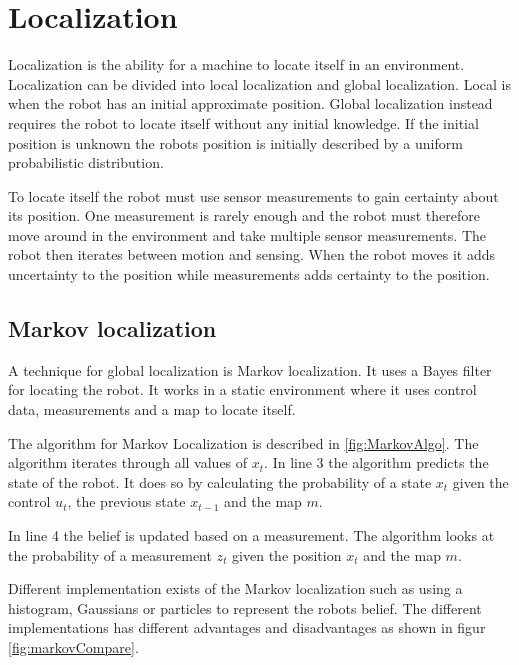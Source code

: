 \chapter{Localization}
\label{chp:local}

Localization is the ability for a machine to locate itself in an environment. Localization can be divided into local localization and global localization. Local is when the robot has an initial approximate position. Global localization instead requires the robot to locate itself without any initial knowledge. If the initial position is unknown the robots position is initially described by a uniform probabilistic distribution. 

To locate itself the robot must use sensor measurements to gain certainty about its position. One measurement is rarely enough and the robot must therefore move around in the environment and take multiple sensor measurements. The robot then iterates between motion and sensing. When the robot moves it adds uncertainty to the position while measurements adds certainty to the position.
 
\section{Markov localization}
A technique for global localization is Markov localization. It uses a Bayes filter for locating the robot. It works in a static environment where it uses control data, measurements and a map to locate itself.

The algorithm for Markov Localization is described in \ref{fig:MarkovAlgo}. The algorithm iterates through all values of $x_t$. In line 3 the algorithm predicts the state of the robot. It does so by calculating the probability of a state $x_t$ given the control $u_t$, the previous state $x_{t-1}$ and the map $m$.

In line 4 the belief is updated based on a measurement. The algorithm looks at the probability of a measurement $z_t$ given the position $x_t$ and the map $m$.



Different implementation exists of the Markov localization such as using a histogram, Gaussians or particles to represent the robots belief. The different implementations has different advantages and disadvantages as shown in figur \ref{fig:markovCompare}. 



